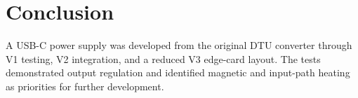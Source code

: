 \chapter{Conclusion}
\label{ch:conclusion}

A USB-C power supply was developed from the original DTU converter
through V1 testing, V2 integration, and a reduced V3 edge-card layout.
The tests demonstrated output regulation and identified magnetic and
input-path heating as priorities for further development.





